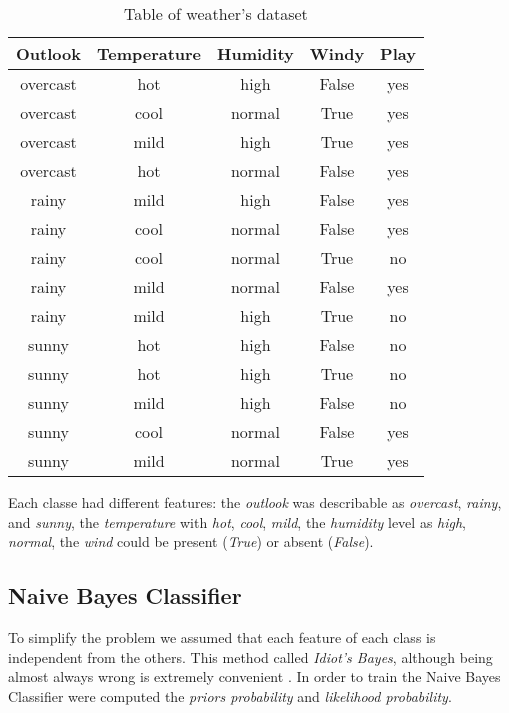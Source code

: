 \documentclass[9pt,technote]{IEEEtran}
\begin{document}
\begin{table}
\small\center
	\begin{tabular}{c|c|c|c|c}
		Outlook   & Temperature & Humidity & Windy & Play \\
		\hline
		overcast  & hot         & high     & False & yes  \\ 
		overcast  & cool        & normal   & True  & yes  \\ 
		overcast  & mild        & high     & True  & yes  \\ 
		overcast  & hot         & normal   & False & yes  \\ 
		rainy     & mild        & high     & False & yes  \\
		rainy     & cool        & normal   & False & yes  \\
		rainy     & cool        & normal   & True  & no   \\
		rainy     & mild        & normal   & False & yes  \\
		rainy     & mild        & high     & True  & no   \\
		sunny     & hot         & high     & False & no   \\
		sunny     & hot         & high     & True  & no   \\
		sunny     & mild        & high     & False & no   \\
		sunny     & cool        & normal   & False & yes  \\
		sunny     & mild        & normal   & True  & yes
	\end{tabular}
	\caption{Table of weather's dataset}
	\footnotesize{Each classe had different features: the \textit{outlook} was describable as \textit{overcast}, \textit{rainy}, and \textit{sunny}, the \textit{temperature} with \textit{hot}, \textit{cool}, \textit{mild}, the \textit{humidity} level as \textit{high}, \textit{normal}, the \textit{wind} could be present (\textit{True}) or absent (\textit{False}).}
	\label{tab::weatherdataset}
\end{table}

\subsection{Naive Bayes Classifier}
To simplify the problem we assumed that each feature of each class is independent from the others. This method called \textit{Idiot's Bayes}, although being almost always wrong  is extremely convenient \cite{schonlau2023AppliedStatisticalLearning}.
In order to train the Naive Bayes Classifier were computed the \textit{priors probability} and \textit{likelihood probability}.
\end{document}
